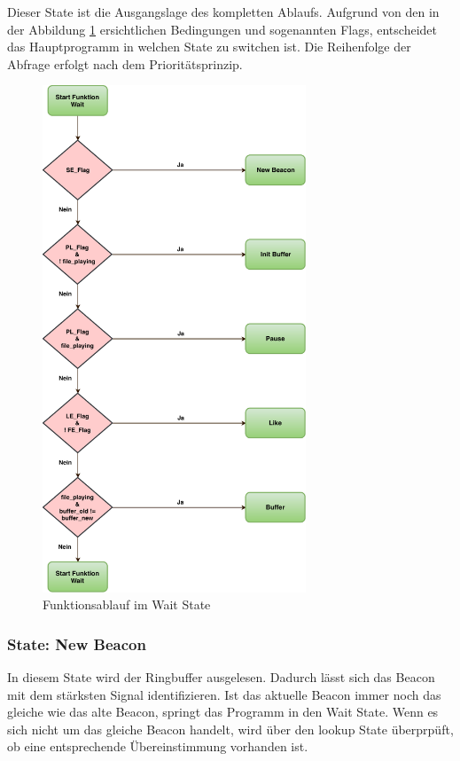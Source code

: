 Dieser State ist die Ausgangslage des kompletten Ablaufs. Aufgrund von den in der Abbildung \ref{fig:waitState} ersichtlichen Bedingungen und sogenannten Flags, entscheidet das Hauptprogramm in welchen State zu switchen ist. Die Reihenfolge der Abfrage erfolgt nach dem Prioritätsprinzip.

\begin{figure}[htbp!!!!]
	\centering
	\includegraphics[width=0.7\textwidth]{Data/Wait_picture.pdf}
	\caption[Statemachine: Wait]{Funktionsablauf im Wait State}
	\label{fig:waitState}
\end{figure} 

\subsubsection*{State: New Beacon}

In diesem State wird der Ringbuffer ausgelesen. Dadurch lässt sich das Beacon mit dem stärksten Signal identifizieren. Ist das aktuelle Beacon immer noch das gleiche wie das alte Beacon, springt das Programm in den Wait State. Wenn es sich nicht um das gleiche Beacon handelt, wird über den lookup State überprpüft, ob eine entsprechende Übereinstimmung vorhanden ist.

